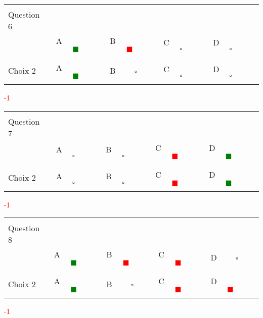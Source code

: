 \documentclass{book}%
\begin{document}
\thispagestyle{empty}%
\begin{center}%
\begin{tabular}{| l  l  l  l  l |}%
\hline%
 & & & & \\%
Question 6\qquad \qquad\ & & & & \\%
& A \textcolor{green}{$\qquad \blacksquare \qquad$}& B \textcolor{red}{$\qquad \blacksquare \qquad$}& C $\qquad \square \qquad$& D $\qquad \square \qquad$\\%
 & & & & \\%
\hline%
 & & & &  \\%
Choix 2& A \textcolor{green}{$\qquad \blacksquare \qquad$}& B $\qquad \square \qquad$& C $\qquad \square \qquad$& D $\qquad \square \qquad$\\%
 & & & &  \\%
\hline%
\end{tabular}%
 \qquad  \textcolor{red}{-1}%
\\ \vskip3mm%
\end{center}%
\thispagestyle{empty}%
\begin{center}%
\begin{tabular}{| l  l  l  l  l |}%
\hline%
 & & & & \\%
Question 7\qquad \qquad\ & & & & \\%
& A $\qquad \square \qquad$& B $\qquad \square \qquad$& C \textcolor{red}{$\qquad \blacksquare \qquad$}& D \textcolor{green}{$\qquad \blacksquare \qquad$}\\%
 & & & & \\%
\hline%
 & & & &  \\%
Choix 2& A $\qquad \square \qquad$& B $\qquad \square \qquad$& C \textcolor{red}{$\qquad \blacksquare \qquad$}& D \textcolor{green}{$\qquad \blacksquare \qquad$}\\%
 & & & &  \\%
\hline%
\end{tabular}%
 \qquad  \textcolor{red}{-1}%
\\ \vskip3mm%
\end{center}%
\thispagestyle{empty}%
\begin{center}%
\begin{tabular}{| l  l  l  l  l |}%
\hline%
 & & & & \\%
Question 8\qquad \qquad\ & & & & \\%
& A \textcolor{green}{$\qquad \blacksquare \qquad$}& B \textcolor{red}{$\qquad \blacksquare \qquad$}& C \textcolor{red}{$\qquad \blacksquare \qquad$}& D $\qquad \square \qquad$\\%
 & & & & \\%
\hline%
 & & & &  \\%
Choix 2& A \textcolor{green}{$\qquad \blacksquare \qquad$}& B $\qquad \square \qquad$& C \textcolor{red}{$\qquad \blacksquare \qquad$}& D \textcolor{red}{$\qquad \blacksquare \qquad$}\\%
 & & & &  \\%
\hline%
\end{tabular}%
 \qquad  \textcolor{red}{-1}%
\\ \vskip3mm%
\end{center}%
\end{document}
